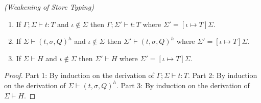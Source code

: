 \begin{lem}
\emph{(Weakening of Store Typing)}\label{lem:weakening-store-typing}
\begin{enumerate}
\item If $\Gamma ; \Sigma \vdash t : T$ and $\iota \notin \Sigma$ then $\Gamma ; \Sigma' \vdash t : T$ where $\Sigma' = [\iota \mapsto T]\Sigma$.
\item If $\Sigma \vdash (t, \sigma, Q)^h$ and $\iota \notin \Sigma$ then $\Sigma' \vdash (t, \sigma, Q)^h$ where $\Sigma' = [\iota \mapsto T]\Sigma$.
\item If $\Sigma \vdash H$ and $\iota \notin \Sigma$ then $\Sigma' \vdash H$ where $\Sigma' = [\iota \mapsto T]\Sigma$.
\end{enumerate}
\end{lem}
\begin{proof}
Part 1: By induction on the derivation of $\Gamma ; \Sigma \vdash t : T$. Part 2: By induction on the derivation of $\Sigma \vdash (t, \sigma, Q)^h$. Part 3: By induction on the derivation of $\Sigma \vdash H$.
\end{proof}

